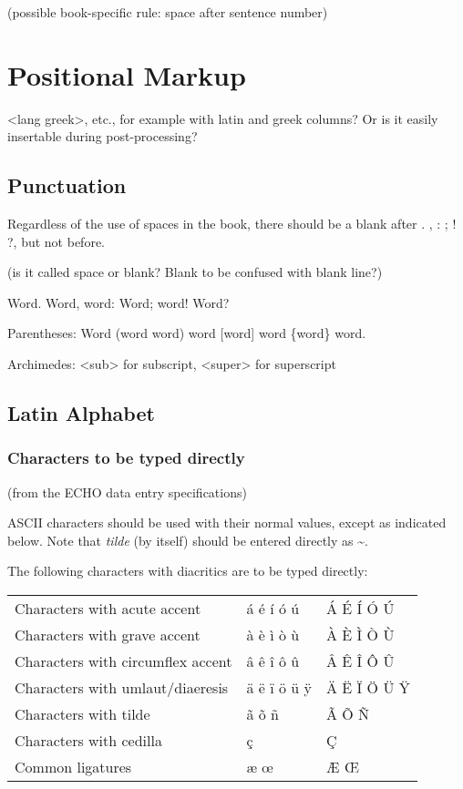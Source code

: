 (possible book-specific rule: space after sentence number)

\section{Positional Markup}


<lang greek>, etc., for example with latin and greek columns? Or is it easily insertable during post-processing?

\subsection{Punctuation}

Regardless of the use of spaces in the book, there should be a blank after . , : ; ! ?, but not before. 

(is it called space or blank? Blank to be confused with blank line?)

\qquad Word. Word, word: Word; word! Word?

Parentheses: Word (word word) word [word] word \{word\} word.

Archimedes: <sub> for subscript, <super> for superscript


\subsection{Latin Alphabet}


\subsubsection{Characters to be typed directly}

(from the ECHO data entry specifications)

ASCII characters should be used with their normal values, except as indicated below. Note that \emph{tilde} (by itself) should be entered directly as \textasciitilde.

The following characters with diacritics are to be typed directly:

\begin{tabular}{lll}
Characters with acute accent & á é í ó ú & Á É Í Ó Ú \\
Characters with grave accent & à è ì ò ù & À È Ì Ò Ù \\
Characters with circumflex accent & â ê î ô û & Â Ê Î Ô Û \\
Characters with umlaut/diaeresis & ä ë ï ö ü ÿ & Ä Ë Ï Ö Ü Ÿ \\
Characters with tilde & ã õ ñ & Ã Õ Ñ \\
Characters with cedilla & ç & Ç \\
Common ligatures & æ œ & Æ Œ \\
\end{tabular}

